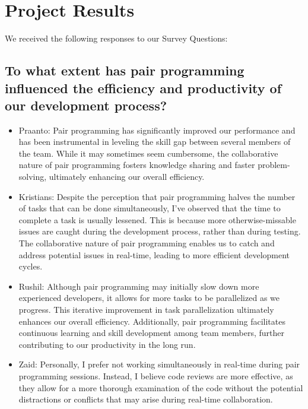 \section{Project Results}
We received the following responses to our Survey Questions:
\subsection{To what extent has pair programming influenced the efficiency and productivity of our development process?}
\begin{itemize}
    \item Praanto: Pair programming has significantly improved our performance and has been instrumental in leveling the skill gap between several members of the team. While it may sometimes seem cumbersome, the collaborative nature of pair programming fosters knowledge sharing and faster problem-solving, ultimately enhancing our overall efficiency.
    \item Kristians: Despite the perception that pair programming halves the number of tasks that can be done simultaneously, I've observed that the time to complete a task is usually lessened. This is because more otherwise-missable issues are caught during the development process, rather than during testing. The collaborative nature of pair programming enables us to catch and address potential issues in real-time, leading to more efficient development cycles.
    \item Rushil: Although pair programming may initially slow down more experienced developers, it allows for more tasks to be parallelized as we progress. This iterative improvement in task parallelization ultimately enhances our overall efficiency. Additionally, pair programming facilitates continuous learning and skill development among team members, further contributing to our productivity in the long run.
    \item Zaid: Personally, I prefer not working simultaneously in real-time during pair programming sessions. Instead, I believe code reviews are more effective, as they allow for a more thorough examination of the code without the potential distractions or conflicts that may arise during real-time collaboration.
\end{itemize}
